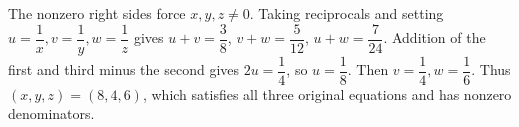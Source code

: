 The nonzero right sides force $x,y,z\ne0$. Taking reciprocals and setting $u=\dfrac{1}{x},v=\dfrac{1}{y},w=\dfrac{1}{z}$ gives $u+v=\dfrac{3}{8}$, $v+w=\dfrac{5}{12}$, $u+w=\dfrac{7}{24}$. Addition of the first and third minus the second gives $2u=\dfrac{1}{4}$, so $u=\dfrac{1}{8}$. Then $v=\dfrac{1}{4},w=\dfrac{1}{6}$. Thus $\boxed{(x,y,z)=(8,4,6)}$, which satisfies all three original equations and has nonzero denominators.
